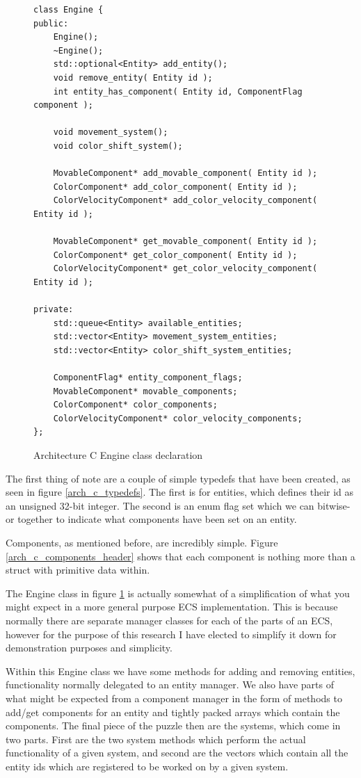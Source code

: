 \documentclass{article}
\begin{document}
\begin{figure}
\centering
\begin{BVerbatim}
class Engine {
public:
    Engine();
    ~Engine();
    std::optional<Entity> add_entity();
    void remove_entity( Entity id );
    int entity_has_component( Entity id, ComponentFlag component );

    void movement_system();
    void color_shift_system();

    MovableComponent* add_movable_component( Entity id );
    ColorComponent* add_color_component( Entity id );
    ColorVelocityComponent* add_color_velocity_component( Entity id );

    MovableComponent* get_movable_component( Entity id );
    ColorComponent* get_color_component( Entity id );
    ColorVelocityComponent* get_color_velocity_component( Entity id );

private:
    std::queue<Entity> available_entities;
    std::vector<Entity> movement_system_entities;
    std::vector<Entity> color_shift_system_entities;

    ComponentFlag* entity_component_flags;
    MovableComponent* movable_components;
    ColorComponent* color_components;
    ColorVelocityComponent* color_velocity_components;
};
\end{BVerbatim}
\caption{Architecture C Engine class declaration}
\label{arch_c_engine_header}
\end{figure}

The first thing of note are a couple of simple typedefs that have been created,
as seen in figure \ref{arch_c_typedefs}. The first is for entities, which
defines their id as an unsigned 32-bit integer. The second is an enum flag set
which we can bitwise-or together to indicate what components have been set on an
entity.

Components, as mentioned before, are incredibly simple. Figure
\ref{arch_c_components_header} shows that each component is nothing more than a
struct with primitive data within.

The Engine class in figure \ref{arch_c_engine_header} is actually somewhat of a
simplification of what you might expect in a more general purpose ECS
implementation. This is because normally there are separate manager classes for
each of the parts of an ECS, however for the purpose of this research I have
elected to simplify it down for demonstration purposes and simplicity.

Within this Engine class we have some methods for adding and removing entities,
functionality normally delegated to an entity manager. We also have parts of
what might be expected from a component manager in the form of methods to
add/get components for an entity and tightly packed arrays which contain the
components. The final piece of the puzzle then are the systems, which come in
two parts. First are the two system methods which perform the actual
functionality of a given system, and second are the vectors which contain all
the entity ids which are registered to be worked on by a given system.
\end{document}
